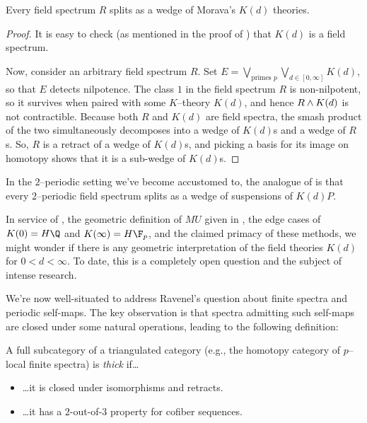 \begin{corollary}\label{FieldSpectraAreKTheories}
Every field spectrum $R$ splits as a wedge of Morava's $K(d)$ theories.
\end{corollary}
\begin{proof}
It is easy to check (as mentioned in the proof of ) that $K(d)$ is a field spectrum.

Now, consider an arbitrary field spectrum $R$.  Set $E = \bigvee_{\text{primes $p$}} \bigvee_{d \in [0, \infty]} K(d)$, so that $E$ detects nilpotence.  The class $1$ in the field spectrum $R$ is non-nilpotent, so it survives when paired with some $K$--theory $K(d)$, and hence $R \wedge K(d)$ is not contractible.  Because both $R$ and $K(d)$ are field spectra, the smash product of the two simultaneously decomposes into a wedge of $K(d)$s and a wedge of $R$s.  So, $R$ is a retract of a wedge of $K(d)$s, and picking a basis for its image on homotopy shows that it is a sub-wedge of $K(d)$s.
\end{proof}

\begin{remark}
In the $2$--periodic setting we've become accustomed to, the analogue of  is that every $2$--periodic field spectrum splits as a wedge of suspensions of $K(d)P$.
\end{remark}

\begin{remark}
In service of , the geometric definition of $MU$ given in , the edge cases of $K(0) = H\Q$ and $K(\infty) = H\F_p$, and the claimed primacy of these methods, we might wonder if there is any geometric interpretation of the field theories $K(d)$ for $0 < d < \infty$.  To date, this is a completely open question and the subject of intense research.
\end{remark}

We're now well-situated to address Ravenel's question about finite spectra and periodic self-maps.  The key observation is that spectra admitting such self-maps are closed under some natural operations, leading to the following definition:

\begin{definition}
A full subcategory of a triangulated category (e.g., the homotopy category of $p$--local finite spectra) is \textit{thick} if\ldots
\begin{itemize}
\item \ldots it is closed under isomorphisms and retracts.
\item \ldots it has a $2$-out-of-$3$ property for cofiber sequences.
\end{itemize}
\end{definition}

